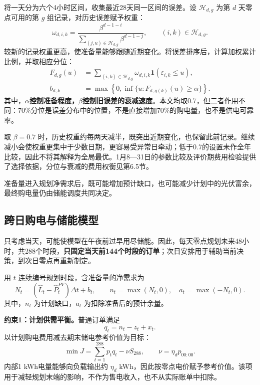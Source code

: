 将一天分为六个4小时区间，收集最近28天同一区间的误差。设 $\mathcal H_{d,g}$ 为第 $d$ 天零点可用的第 $g$ 组记录，对历史误差赋予权重：
\begin{equation}
\omega_{d,i,k}=\frac{\beta^{d-1-i}}{\displaystyle\sum_{(j,u)\in\mathcal H_{d,g}}\beta^{d-1-j}},\qquad (i,k)\in\mathcal H_{d,g}.
\label{eq:q2_weight}
\end{equation}
较新的记录权重更高，使准备量能够跟随近期变化。将误差排序后，计算加权累计比例，并取相应分位：
\begin{align}
F_{d,g}(u)&=\sum_{(i,k)\in\mathcal H_{d,g}}\omega_{d,i,k}\mathbf1(\varepsilon_{i,k}\le u),\label{eq:q2_cdf}\\
b_{d,k}&=\max\left\{0,\inf\{u:F_{d,g(k)}(u)\ge\alpha\}\right\}.\label{eq:q2_reserve}
\end{align}
其中，\textbf{$\alpha$控制准备程度，$\beta$控制旧误差的衰减速度}。本文均取0.7，但二者作用不同：70\%分位是误差分布中的位置，不是直接增加70\%的购电量，也不是供电可靠率。

取 $\beta=0.7$ 时，历史权重约每两天减半，既突出近期变化，也保留此前记录。继续减小会使权重更集中于少数日期，更容易受异常日牵动；低于0.7的设置未作全年比较，因此不将其解释为全局最优。1月8—31日的参数比较及评价期费用检验提供了选择依据，分位与衰减的费用权衡见第6.5节。

准备量进入规划净需求后，既可能增加预计缺口，也可能减少计划中的光伏富余，最终购电量仍由储能调度共同决定。

\subsection{跨日购电与储能模型}
只考虑当天，可能使模型在午夜前过早用尽储能。因此，每天零点规划未来48小时，共288个时段，\textbf{只固定当天前144个时段的订单}；次日安排用于辅助当前决策，到次日零点再重新制定。

用 $t$ 连续编号规划时段，含准备量的净需求为
\begin{equation}
N_t=(\widehat L_t-\widehat P^{PV}_t)\Delta t+b_t,\qquad
n_t=\max(N_t,0),\quad a_t=\max(-N_t,0).
\label{eq:q2_net_demand}
\end{equation}
其中，$n_t$ 为计划缺口，$a_t$ 为扣除准备后的预计余量。

\noindent\textbf{约束1：计划供需平衡。}普通订单满足
\begin{equation}
q_t=n_t-z_t+x_t.
\label{eq:q2_purchase}
\end{equation}
以计划购电费用减去期末储电参考价值为目标：
\begin{equation}
\min J=\sum_{t=1}^{288}p_tq_t-\nu S_{288},\qquad \nu=\eta_dp_{00:00}.
\label{eq:q2_objective}
\end{equation}
内部1 kWh电量能够向负载输出约 $\eta_d$ kWh，因此按零点电价赋予参考价值。该项用于减轻规划末端的影响，不作为售电收入，也不从实际账单中扣除。

